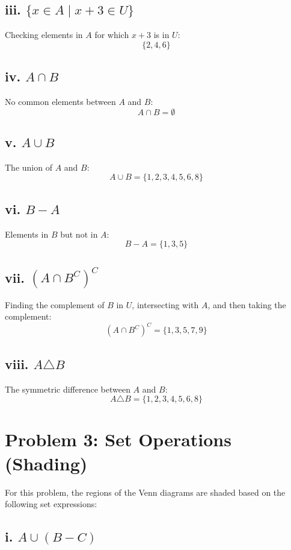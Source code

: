 \documentclass{article}
\begin{document}
\subsection*{iii. \( \{x \in A \mid x + 3 \in U \} \)}
Checking elements in \(A\) for which \(x + 3\) is in \(U\):
\[
\{2, 4, 6\}
\]

\subsection*{iv. \( A \cap B \)}
No common elements between \(A\) and \(B\):
\[
A \cap B = \emptyset
\]

\subsection*{v. \( A \cup B \)}
The union of \(A\) and \(B\):
\[
A \cup B = \{1, 2, 3, 4, 5, 6, 8\}
\]

\subsection*{vi. \( B - A \)}
Elements in \(B\) but not in \(A\):
\[
B - A = \{1, 3, 5\}
\]

\subsection*{vii. \( (A \cap B^C)^C \)}
Finding the complement of \(B\) in \(U\), intersecting with \(A\), and then taking the complement:
\[
(A \cap B^C)^C = \{1, 3, 5, 7, 9\}
\]

\subsection*{viii. \( A \triangle B \)}
The symmetric difference between \(A\) and \(B\):
\[
A \triangle B = \{1, 2, 3, 4, 5, 6, 8\}
\]

\newpage

\section*{Problem 3: Set Operations (Shading)}

For this problem, the regions of the Venn diagrams are shaded based on the following set expressions:

\subsection*{i. \( A \cup (B - C) \)}
\end{document}
